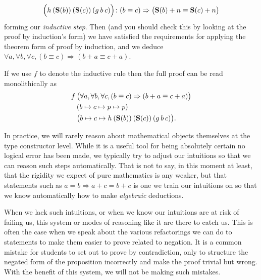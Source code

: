\documentclass[11pt]{article}
\begin{document}
\begin{corollary}
\begin{gather*}
\Big(
	h \hspace{0.2em} (\mathbf{S}(b)) \hspace{0.2em} (\mathbf{S}(c)) \hspace{0.2em} (g \hspace{0.2em} b \hspace{0.2em} c)
\Big)
\colon (b \equiv c)
\Rightarrow \big(\mathbf{S}(b) + n \equiv \mathbf{S}(c) + n \big)
\end{gather*}
forming our \emph{inductive step}. Then (and you should check this by looking at the proof by induction's form) we have satisfied the requirements for applying the theorem form of proof by induction, and we deduce $\forall a, \forall b, \forall c, (b \equiv c) \Rightarrow (b + a \equiv c + a)$.

If we use $f$ to denote the inductive rule then the full proof can be read monolithically as \begin{align*}
f \hspace{0.2em}
& \big( \forall a, \forall b, \forall c, (b \equiv c) \Rightarrow (b + a \equiv c + a) \big) \\
& (b \mapsto c \mapsto p \mapsto p) \\
& \big(b \mapsto c \mapsto h \hspace{0.2em} (\mathbf{S}(b)) \hspace{0.2em} (\mathbf{S}(c)) \hspace{0.2em} (g \hspace{0.2em} b \hspace{0.2em} c)\big).
\end{align*}
\end{corollary}

In practice, we will rarely reason about mathematical objects themselves at the type constructor level. While it is a useful tool for being absolutely certain no logical error has been made, we typically try to adjust our intuitions so that we can reason such steps automatically. That is not to say, in this moment at least, that the rigidity we expect of pure mathematics is any weaker, but that statements such as $a = b \Rightarrow a + c = b + c$ is one we train our intuitions on so that we know automatically how to make \emph{algebraic} deductions.

When we lack such intuitions, or when we know our intuitions are at risk of failing us, this system or modes of reasoning like it are there to catch us. This is often the case when we speak about the various refactorings we can do to statements to make them easier to prove related to negation. It is a common mistake for students to set out to prove by contradiction, only to structure the negated form of the proposition incorrectly and make the proof trivial but wrong. With the benefit of this system, we will not be making such mistakes.
\end{document}
